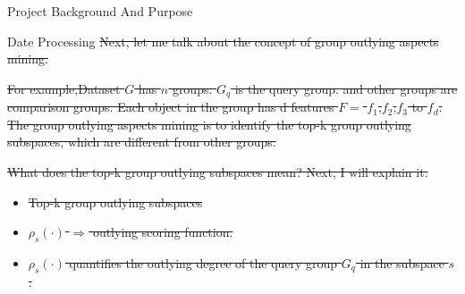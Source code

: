 \documentclass[
 size=14pt,
 paper=smartboard,  %
 mode=present, 		%
 display=slides, 	%
 style=tuliplab,  	%
 pauseslide,
 fleqn,leqno]{powerdot}
\providecommand{\DIFdeltex}[1]{{\protect\color{red}\sout{#1}}}                      %
\providecommand{\DIFaddbegin}{} %
\providecommand{\DIFaddend}{} %
\providecommand{\DIFdelbegin}{} %
\providecommand{\DIFdelend}{} %
\providecommand{\DIFdel}[1]{\texorpdfstring{\DIFdeltex{#1}}{}} %
\newcommand{\DIFscaledelfig}{0.5}
\newlength{\DIFdelgraphicswidth} %
\newlength{\DIFdelgraphicsheight} %
\newcommand{\DIFaddincludegraphics}[2][]{{\color{blue}\fbox{\DIFOincludegraphics[#1]{#2}}}} %
\newcommand{\DIFdelincludegraphics}[2][]{%
\sbox{\DIFdelgraphicsbox}{\DIFOincludegraphics[#1]{#2}}%
\settoboxwidth{\DIFdelgraphicswidth}{\DIFdelgraphicsbox} %
\settoboxtotalheight{\DIFdelgraphicsheight}{\DIFdelgraphicsbox} %
\scalebox{\DIFscaledelfig}{%
\parbox[b]{\DIFdelgraphicswidth}{\usebox{\DIFdelgraphicsbox}\\[-\baselineskip] \rule{\DIFdelgraphicswidth}{0em}}\llap{\resizebox{\DIFdelgraphicswidth}{\DIFdelgraphicsheight}{%
\setlength{\unitlength}{\DIFdelgraphicswidth}%
\begin{picture}(1,1)%
\thicklines\linethickness{2pt} %
{\color[rgb]{1,0,0}\put(0,0){\framebox(1,1){}}}%
{\color[rgb]{1,0,0}\put(0,0){\line( 1,1){1}}}%
{\color[rgb]{1,0,0}\put(0,1){\line(1,-1){1}}}%
\end{picture}%
}\hspace*{3pt}}} %
} %
\DeclareRobustCommand{\DIFaddbegin}{\DIFOaddbegin \let\includegraphics\DIFaddincludegraphics} %
\DeclareRobustCommand{\DIFaddend}{\DIFOaddend \let\includegraphics\DIFOincludegraphics} %
\DeclareRobustCommand{\DIFdelbegin}{\DIFOdelbegin \let\includegraphics\DIFdelincludegraphics} %
\DeclareRobustCommand{\DIFdelend}{\DIFOaddend \let\includegraphics\DIFOincludegraphics} %
\begin{document}
\begin{slide}
\begin{slide}{Project Background And Purpose}
\begin{slide}{Date Processing}
\DIFdelbegin %
\DIFdel{Next, let me talk about the concept of group outlying aspects mining.
}\DIFdelend \DIFaddbegin \bigskip
\DIFaddend 





\DIFdelbegin \DIFdel{For example,Dataset $G$ has $n$ groups.
$G_q$ is the query group.
and other groups are comparison groups.
Each object in the group has d features $F = $ $f_1$,$f_2$,$f_3$ to $f_d$. The group outlying aspects mining is to identify the top-k group outlying subspaces,
which are different from other groups.
}%

\DIFdel{What does the top-k group outlying subspaces mean?
Next, I will explain it.
}%

\DIFdelend %
\DIFdelbegin %

\begin{itemize}%
\item%
\DIFdel{Top-k group outlying subspaces
}%

\item%
\DIFdel{$\rho_s(\cdot)$ $\Rightarrow$ outlying scoring function.
}%

\item%
\DIFdel{$\rho_s(\cdot)$ quantifies the outlying degree of the
query group $G_q$ in the subspace $s$.
}%


\end{itemize}
\end{slide}
\end{slide}
\end{slide}
\end{document}
